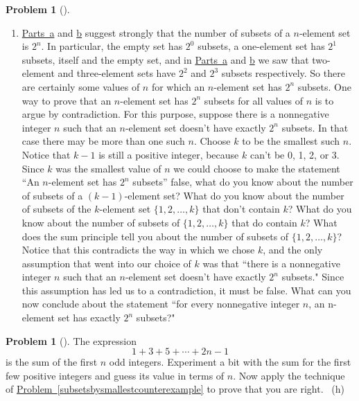 \documentclass[10pt,]{book}
\theoremstyle{plain}
\theoremstyle{definition}
\newtheorem{activity}[project]{Problem}
\theoremstyle{definition}
\numberwithin{equation}{chapter}
\begin{document}
\begin{activity}[]
\begin{enumerate}[font=\bfseries,label=(\alph*),ref=\alph*]
\item\label{task-258} \marginsymbol[-2.5em]{} \hypertarget{p-1985}{}%
\hyperref[subsetsbysmallestcounterexample1]{Parts~a} and \hyperref[subsetsbysmallestcounterexample2]{b} suggest strongly that the number of subsets of a \(n\)-element set is \(2^n\). In particular, the empty set has \(2^0\) subsets, a one-element set has \(2^1\) subsets, itself and the empty set, and in \hyperref[subsetsbysmallestcounterexample1]{Parts~a} and \hyperref[subsetsbysmallestcounterexample2]{b} we saw that two-element and three-element sets have \(2^2\) and \(2^3\) subsets respectively. So there are certainly some values of \(n\) for which an \(n\)-element set has \(2^n\) subsets. One way to prove that an \(n\)-element set has \(2^n\) subsets for all values of \(n\) is to argue by contradiction. For this purpose, suppose there is a nonnegative integer \(n\) such that an \(n\)-element set doesn't have exactly \(2^n\) subsets. In that case there may be more than one such \(n\). Choose \(k\) to be the smallest such \(n\). Notice that \(k -1\) is still a positive integer, because \(k\) can't be 0, 1, 2, or 3. Since \(k\) was the smallest value of \(n\) we could choose to make the statement ``An \(n\)-element set has \(2^n\) subsets'' false, what do you know about the number of subsets of a \((k - 1)\)-element set? What do you know about the number of subsets of the \(k\)-element set \(\{1, 2, \ldots, k \}\) that don't contain \(k\)? What do you know about the number of subsets of \(\{1,
2, \ldots,  k \}\) that do contain \(k\)? What does the sum principle tell you about the number of subsets of \(\{1, 2, \ldots, k \}\)? Notice that this contradicts the way in which we chose \(k\), and the only assumption that went into our choice of \(k\) was that ``there is a nonnegative integer \(n\) such that an \(n\)-element set doesn't have exactly \(2^n\) subsets." Since this assumption has led us to a contradiction, it must be false. What can you now conclude about the statement ``for every nonnegative integer \(n\), an n-element set has exactly \(2^n\) subsets?"%
\end{enumerate}
\end{activity}
\begin{activity}[]\marginsymbol[-1em]{} \label{sumodd}
\hypertarget{p-1987}{}%
The expression%
\begin{equation*}
1+3+5+\cdots+2n-1
\end{equation*}
is the sum of the first \(n\) odd integers. Experiment a bit with the sum for the first few positive integers and guess its value in terms of \(n\). Now apply the technique of \hyperref[subsetsbysmallestcounterexample]{Problem~\ref{subsetsbysmallestcounterexample}} to prove that you are right.%
~{\tiny (h)}\end{activity}
\end{document}
